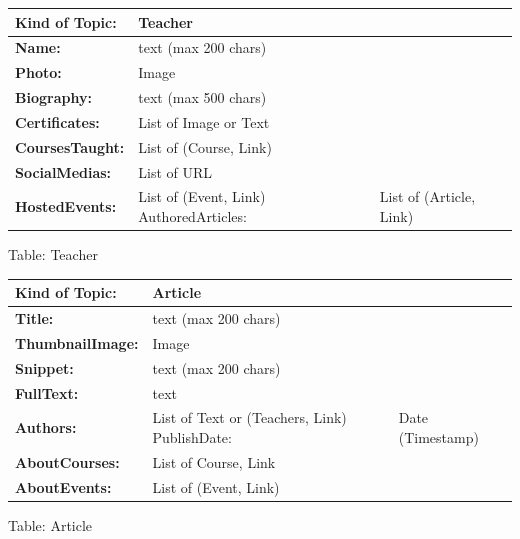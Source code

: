 \documentclass{article}
\begin{document}
\begin{center}
        \begin{tabularx}{\textwidth}{|>{\bfseries}l|X|}
                \hline
                Kind of Topic: & \textbf{Teacher} \\
                \hline
                Name: & text  (max 200 chars)\\
                \hline
                Photo: & Image \\
                \hline
                Biography: & text (max 500 chars) \\
                \hline
                Certificates: & List of {Image or Text} \\
                \hline
                CoursesTaught: & List of {(Course, Link)} \\
                \hline
                SocialMedias: & List of {URL} \\
                \hline
                HostedEvents: & List of {(Event, Link)}
                \hline
                AuthoredArticles: & List of {(Article, Link)} \\
                \hline

        \end{tabularx}
        \caption{Table: Teacher}
\end{center}
\begin{center}
        \begin{tabularx}{\textwidth}{|>{\bfseries}l|X|}
                \hline
                Kind of Topic: & \textbf{Article} \\
                \hline
                Title: & text  (max 200 chars)\\
                \hline
                ThumbnailImage: & Image \\
                \hline
                Snippet: & text (max 200 chars) \\
                \hline
                FullText: & text \\
                \hline
                Authors: & List of {Text or (Teachers, Link)}
                \hline
                PublishDate: & Date (Timestamp) \\
                \hline
                AboutCourses: & List of {Course, Link} \\
                \hline
                AboutEvents: & List of {(Event, Link)}
                \hline
        \end{tabularx}
        \caption{Table: Article}
\end{center}
\end{document}
